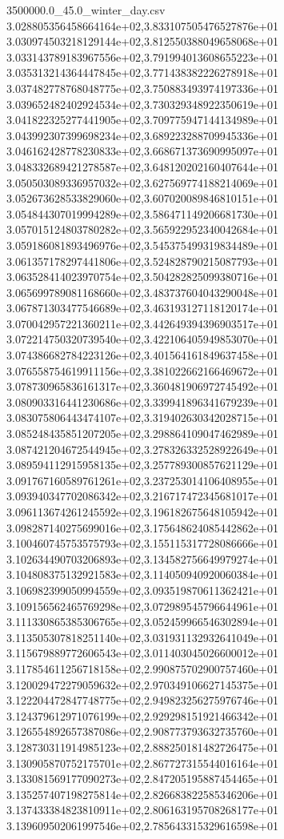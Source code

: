 \begin{filecontents*}{3500000.0_45.0_winter_day.csv}
3.028805356458664164e+02,3.833107505476527876e+01
3.030974503218129144e+02,3.812550388049658068e+01
3.033143789183967556e+02,3.791994013608655223e+01
3.035313214364447845e+02,3.771438382226278918e+01
3.037482778768048775e+02,3.750883493974197336e+01
3.039652482402924534e+02,3.730329348922350619e+01
3.041822325277441905e+02,3.709775947144134989e+01
3.043992307399698234e+02,3.689223288709945336e+01
3.046162428778230833e+02,3.668671373690995097e+01
3.048332689421278587e+02,3.648120202160407644e+01
3.050503089336957032e+02,3.627569774188214069e+01
3.052673628533829060e+02,3.607020089846810151e+01
3.054844307019994289e+02,3.586471149206681730e+01
3.057015124803780282e+02,3.565922952340042684e+01
3.059186081893496976e+02,3.545375499319834489e+01
3.061357178297441806e+02,3.524828790215087793e+01
3.063528414023970754e+02,3.504282825099380716e+01
3.065699789081168660e+02,3.483737604043290048e+01
3.067871303477546689e+02,3.463193127118120174e+01
3.070042957221360211e+02,3.442649394396903517e+01
3.072214750320739540e+02,3.422106405949853070e+01
3.074386682784223126e+02,3.401564161849637458e+01
3.076558754619911156e+02,3.381022662166469672e+01
3.078730965836161317e+02,3.360481906972745492e+01
3.080903316441230686e+02,3.339941896341679239e+01
3.083075806443474107e+02,3.319402630342028715e+01
3.085248435851207205e+02,3.298864109047462989e+01
3.087421204672544945e+02,3.278326332528922649e+01
3.089594112915958135e+02,3.257789300857621129e+01
3.091767160589761261e+02,3.237253014106408955e+01
3.093940347702086342e+02,3.216717472345681017e+01
3.096113674261245592e+02,3.196182675648105942e+01
3.098287140275699016e+02,3.175648624085442862e+01
3.100460745753575793e+02,3.155115317728086666e+01
3.102634490703206893e+02,3.134582756649979274e+01
3.104808375132921583e+02,3.114050940920060384e+01
3.106982399050994559e+02,3.093519870611362421e+01
3.109156562465769298e+02,3.072989545796644961e+01
3.111330865385306765e+02,3.052459966546302894e+01
3.113505307818251140e+02,3.031931132932641049e+01
3.115679889772606543e+02,3.011403045026600012e+01
3.117854611256718158e+02,2.990875702900757460e+01
3.120029472279059632e+02,2.970349106627145375e+01
3.122204472847748775e+02,2.949823256275976746e+01
3.124379612971076199e+02,2.929298151921466342e+01
3.126554892657387086e+02,2.908773793632735760e+01
3.128730311914985123e+02,2.888250181482726475e+01
3.130905870752175701e+02,2.867727315544016164e+01
3.133081569177090273e+02,2.847205195887454465e+01
3.135257407198275814e+02,2.826683822585346206e+01
3.137433384823810911e+02,2.806163195708268177e+01
3.139609502061997546e+02,2.785643315329616598e+01

\end{filecontents*}
